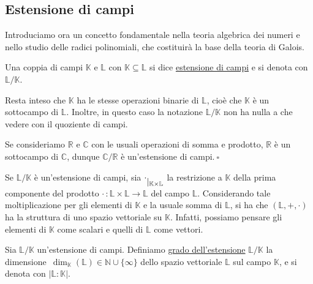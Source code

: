 
\vspace{1.75mm}
\subsection{Estensione di campi}

\noindent Introduciamo ora un concetto fondamentale nella teoria algebrica dei numeri e nello studio delle radici polinomiali, che costituirà la base della teoria di Galois.

\begin{defn}[]{}
Una coppia di campi $\mathbb{K}$ e $\mathbb{L}$ con $\mathbb{K}\subseteq \mathbb{L}$ si dice \underline{estensione di campi} e si denota con $\mathbb{L}/\mathbb{K}$.
\end{defn}

\noindent Resta inteso che $\mathbb{K}$ ha le stesse operazioni binarie di $\mathbb{L}$, cioè che $\mathbb{K}$ è un sottocampo di $\mathbb{L}$. Inoltre, in questo caso la notazione $\mathbb{L}/\mathbb{K}$ non ha nulla a che vedere con il quoziente di campi.

\begin{exm}Se consideriamo $\mathbb{R}$ e $\mathbb{C}$ con le usuali operazioni di somma e prodotto, $\mathbb{R}$ è un sottocampo di $\mathbb{C}$, dunque $\mathbb{C}/\mathbb{R}$ è un'estensione di campi$. \ \square$\end{exm}

\noindent Se $\mathbb{L}/\mathbb{K}$ è un'estensione di campi, sia $\cdot \raisebox{-.5em}{$\vert_{\mathbb{K}\times\mathbb{L}}$}$ la restrizione a $\mathbb{K}$ della prima componente del prodotto $\cdot \, \colon \mathbb{L}\times\mathbb{L}\to\mathbb{L}$ del campo $\mathbb{L}$. Considerando tale moltiplicazione per gli elementi di $\mathbb{K}$ e la usuale somma di $\mathbb{L}$, si ha che $(\mathbb{L},+,\cdot)$ ha la struttura di uno spazio vettoriale su $\mathbb{K}$. Infatti, possiamo pensare gli elementi di $\mathbb{K}$ come scalari e quelli di $\mathbb{L}$ come vettori.

\begin{defn}[]{}
Sia $\mathbb{L}/\mathbb{K}$ un'estensione di campi. Definiamo \underline{grado dell'estensione} $\mathbb{L}/\mathbb{K}$ la dimensione\footnotemark \ $\operatorname{dim}_{\mathbb{K}}(\mathbb{L})\in \mathbb{N}\cup \{\infty\}$ dello spazio vettoriale $\mathbb{L}$ sul campo $\mathbb{K}$, e si denota con $|\mathbb{L} : \mathbb{K}|$.
\end{defn} 

